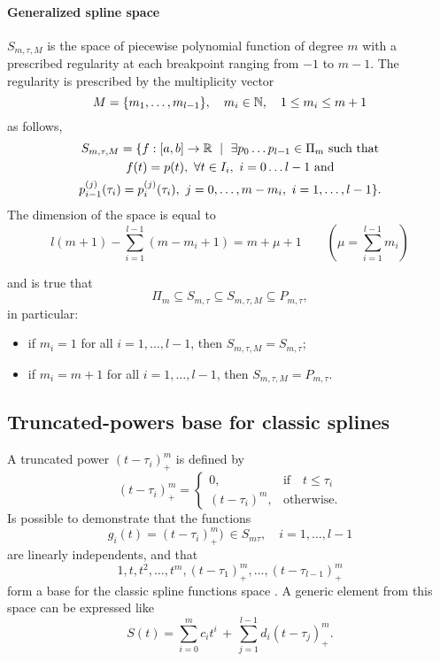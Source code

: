 \documentclass[dissertation.tex]{subfiles}
\begin{document}
\paragraph{Generalized spline space} $S_{m,\tau,M}$ is the
space of piecewise polynomial function of degree $m$ with a prescribed
regularity at each breakpoint ranging from $-1$ to $m-1$. The
regularity is prescribed by the multiplicity vector
$$
M=\{m_1,\dots,m_{l-1}\},\quad m_i\in\mathbb{N},\quad 1\leq m_i\leq m+1
$$
as follows,
\begin{multline*}
  S_{m,\tau,M}=\{f:[a,b]\rightarrow\mR\ \mid\ \exists p_0\dots
  p_{l-1}\in\Pi_m \ \text{such that}\\
  f(t)=p(t),\ \forall t\in I_i,\
  i=0\dots l-1\ \text{and}\\
  p_{i-1}^{(j)}(\tau_i)=p_{i}^{(j)}(\tau_i),\ j=0,\dots,m-m_i,\ i=1,\dots,l-1\}.
\end{multline*}
The dimension of the space is equal to 
$$
l(m+1)-\sum_{i=1}^{l-1}(m-m_i+1)=m+\mu +1\qquad(\mu=\sum_{i=1}^{l-1}m_i)
$$

and is true that
$$
\Pi_m\subseteq S_{m,\tau}\subseteq S_{m,\tau,M}\subseteq P_{m,\tau},
$$
in particular:
\begin{itemize}
  \item if $m_i=1$ for all $i=1,\dots,l-1$, then
    $S_{m,\tau,M}=S_{m,\tau}$;
  \item if $m_i=m+1$ for all $i=1,\dots,l-1$, then
    $S_{m,\tau,M}=P_{m,\tau}$.
\end{itemize}

\subsection{Truncated-powers base for classic
  splines}\label{sec:truncpow}
A truncated power $(t-\tau_i)_+^m$ is
defined by
$$
(t-\tau_i)_+^m=
\begin{cases}
  0,&\mbox{if}\quad t\leq\tau_i\\
  (t-\tau_i)^m, &\mbox{otherwise}.
\end{cases}
$$
Is possible to demonstrate that the functions
$$
g_i(t)=(t-\tau_i)_+^m)\ \in S_{m\tau},\quad i=1,\dots,l-1
$$
are linearly independents, and that
$$
1,t,t^2,\dots,t^m,(t-\tau_1)_+^m,\dots,(t-\tau_{l-1})_+^m
$$
form a base for the classic spline functions space \cite{deboor}. A
generic element
from this space can be expressed like
\begin{equation}\label{eq:classicSplineElement}
  S(t)=\sum_{i=0}^m c_i t^i\, +\, \sum_{j=1}^{l-1} d_i (t-\tau_j)_+^m.
\end{equation}
\end{document}
